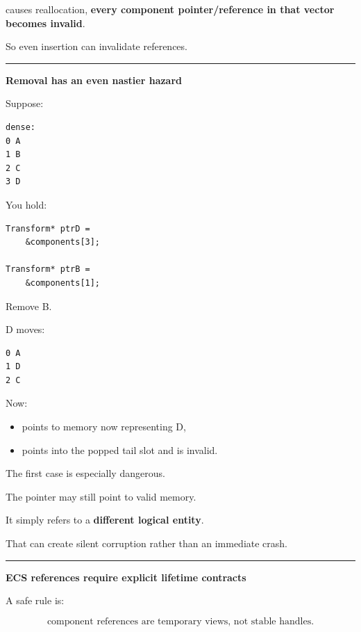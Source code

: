 causes  reallocation, \textbf{every component pointer/reference in that vector becomes invalid}.

So even insertion can invalidate references.

\begin{center}\rule{0.5\linewidth}{0.5pt}\end{center}

\textbf{Removal has an even nastier hazard}

Suppose:

\begin{verbatim}
dense:
0 A
1 B
2 C
3 D
\end{verbatim}

You hold:

\begin{verbatim}
Transform* ptrD =
    &components[3];

Transform* ptrB =
    &components[1];
\end{verbatim}

Remove B.

D moves:

\begin{verbatim}
0 A
1 D
2 C
\end{verbatim}

Now:

\begin{itemize}
\tightlist
\item
   points to memory now representing D,
\item
   points into the popped tail slot and is invalid.
\end{itemize}

The first case is especially dangerous.

The pointer may still point to valid memory.

It simply refers to a \textbf{different logical entity}.

That can create silent corruption rather than an immediate crash.

\begin{center}\rule{0.5\linewidth}{0.5pt}\end{center}

\textbf{ECS references require explicit lifetime contracts}

A safe rule is:

\[
\boxed{
\text{component references are temporary views, not stable handles}.
}
\]

